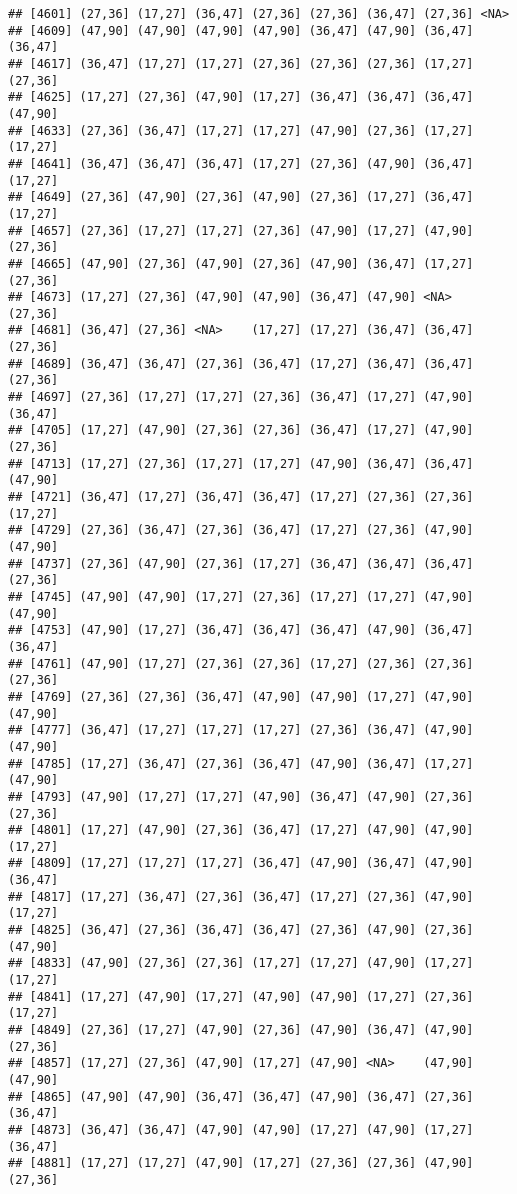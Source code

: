 \documentclass[12pt,]{article}
\begin{document}
\begin{verbatim}
## [4601] (27,36] (17,27] (36,47] (27,36] (27,36] (36,47] (27,36] <NA>   
## [4609] (47,90] (47,90] (47,90] (47,90] (36,47] (47,90] (36,47] (36,47]
## [4617] (36,47] (17,27] (17,27] (27,36] (27,36] (27,36] (17,27] (27,36]
## [4625] (17,27] (27,36] (47,90] (17,27] (36,47] (36,47] (36,47] (47,90]
## [4633] (27,36] (36,47] (17,27] (17,27] (47,90] (27,36] (17,27] (17,27]
## [4641] (36,47] (36,47] (36,47] (17,27] (27,36] (47,90] (36,47] (17,27]
## [4649] (27,36] (47,90] (27,36] (47,90] (27,36] (17,27] (36,47] (17,27]
## [4657] (27,36] (17,27] (17,27] (27,36] (47,90] (17,27] (47,90] (27,36]
## [4665] (47,90] (27,36] (47,90] (27,36] (47,90] (36,47] (17,27] (27,36]
## [4673] (17,27] (27,36] (47,90] (47,90] (36,47] (47,90] <NA>    (27,36]
## [4681] (36,47] (27,36] <NA>    (17,27] (17,27] (36,47] (36,47] (27,36]
## [4689] (36,47] (36,47] (27,36] (36,47] (17,27] (36,47] (36,47] (27,36]
## [4697] (27,36] (17,27] (17,27] (27,36] (36,47] (17,27] (47,90] (36,47]
## [4705] (17,27] (47,90] (27,36] (27,36] (36,47] (17,27] (47,90] (27,36]
## [4713] (17,27] (27,36] (17,27] (17,27] (47,90] (36,47] (36,47] (47,90]
## [4721] (36,47] (17,27] (36,47] (36,47] (17,27] (27,36] (27,36] (17,27]
## [4729] (27,36] (36,47] (27,36] (36,47] (17,27] (27,36] (47,90] (47,90]
## [4737] (27,36] (47,90] (27,36] (17,27] (36,47] (36,47] (36,47] (27,36]
## [4745] (47,90] (47,90] (17,27] (27,36] (17,27] (17,27] (47,90] (47,90]
## [4753] (47,90] (17,27] (36,47] (36,47] (36,47] (47,90] (36,47] (36,47]
## [4761] (47,90] (17,27] (27,36] (27,36] (17,27] (27,36] (27,36] (27,36]
## [4769] (27,36] (27,36] (36,47] (47,90] (47,90] (17,27] (47,90] (47,90]
## [4777] (36,47] (17,27] (17,27] (17,27] (27,36] (36,47] (47,90] (47,90]
## [4785] (17,27] (36,47] (27,36] (36,47] (47,90] (36,47] (17,27] (47,90]
## [4793] (47,90] (17,27] (17,27] (47,90] (36,47] (47,90] (27,36] (27,36]
## [4801] (17,27] (47,90] (27,36] (36,47] (17,27] (47,90] (47,90] (17,27]
## [4809] (17,27] (17,27] (17,27] (36,47] (47,90] (36,47] (47,90] (36,47]
## [4817] (17,27] (36,47] (27,36] (36,47] (17,27] (27,36] (47,90] (17,27]
## [4825] (36,47] (27,36] (36,47] (36,47] (27,36] (47,90] (27,36] (47,90]
## [4833] (47,90] (27,36] (27,36] (17,27] (17,27] (47,90] (17,27] (17,27]
## [4841] (17,27] (47,90] (17,27] (47,90] (47,90] (17,27] (27,36] (17,27]
## [4849] (27,36] (17,27] (47,90] (27,36] (47,90] (36,47] (47,90] (27,36]
## [4857] (17,27] (27,36] (47,90] (17,27] (47,90] <NA>    (47,90] (47,90]
## [4865] (47,90] (47,90] (36,47] (36,47] (47,90] (36,47] (27,36] (36,47]
## [4873] (36,47] (36,47] (47,90] (47,90] (17,27] (47,90] (17,27] (36,47]
## [4881] (17,27] (17,27] (47,90] (17,27] (27,36] (27,36] (47,90] (27,36]

\end{verbatim}
\end{document}
